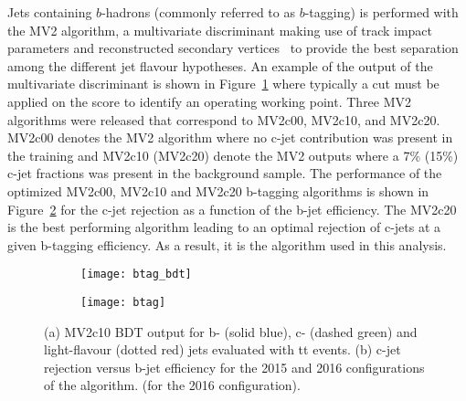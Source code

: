 Jets containing $b$-hadrons (commonly referred to as $b$-tagging) 
is performed with the MV2 algorithm, a multivariate discriminant making 
use of track impact parameters 
and reconstructed secondary vertices~\cite{Aad:2015ydr,ATL-PHYS-PUB-2015-022}
to provide the best separation among the different jet flavour hypotheses.
An example of the output of the multivariate discriminant is shown in Figure~\ref{fig:exp.btag.bdt} 
where typically a cut must be applied on the score to identify an operating working point. 
Three MV2 algorithms were released that correspond to MV2c00, MV2c10, and 
MV2c20.
MV2c00 denotes the MV2 algorithm where no c-jet contribution was present in the training and MV2c10 (MV2c20) denote the MV2 outputs where a 7\% (15\%) c-jet fractions was present 
in the background sample.
The performance of the optimized  MV2c00, MV2c10 and MV2c20 b-tagging algorithms is shown in Figure~\ref{fig:exp.btag.eff}
for the c-jet rejection as a function of the b-jet efficiency.
The MV2c20 is the best performing algorithm leading to an optimal rejection of c-jets at a given b-tagging 
efficiency. As a result, it is the algorithm used in this analysis.


\begin{figure}[htb!]
\centering
\begin{subfigure}[t]{0.48\textwidth}
\texttt{[image: btag\_bdt]}
\subcaption{}
\label{fig:exp.btag.bdt}
\end{subfigure}
\begin{subfigure}[t]{0.48\textwidth}
\texttt{[image: btag]}
\subcaption{}
\label{fig:exp.btag.eff}
\end{subfigure}
\vspace{-0.25cm}
\caption{
(a) MV2c10 BDT output for b- (solid blue), c- (dashed green) and light-flavour (dotted red) jets evaluated with tt events. 
(b) c-jet rejection versus b-jet efficiency for the 2015 and 2016 configurations of the algorithm.
 (for the 2016 configuration). 
}
\label{fig:exp.btag}
\end{figure} 


